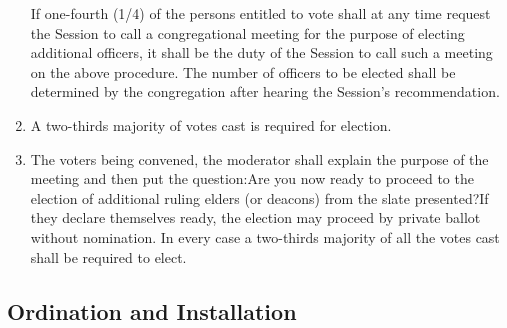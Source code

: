 \documentclass[
]{book}
\begin{document}
\begin{enumerate}
  If one-fourth (1/4) of the persons entitled to vote shall at any time request the Session to call a congregational meeting for the purpose of electing additional officers, it shall be the duty of the Session to call such a meeting on the above procedure. The number of officers to be elected shall be determined by the congregation after hearing the Session's recommendation.
\item
  A two-thirds majority of votes cast is required for election.
\item
  The voters being convened, the moderator shall explain the purpose of the meeting and then put the question:Are you now ready to proceed to the election of additional ruling elders (or deacons) from the slate presented?If they declare themselves ready, the election may proceed by private ballot without nomination. In every case a two-thirds majority of all the votes cast shall be required to elect.
\end{enumerate}

\hypertarget{ordination-and-installation}{%
\subsection*{Ordination and Installation}\label{ordination-and-installation}}
\end{document}

